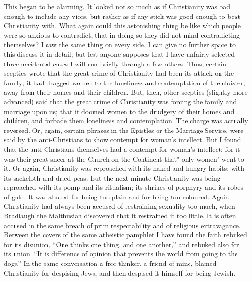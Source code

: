 \documentclass{book}
\begin{document}
This began to be alarming. It looked not so much as if Christianity was bad enough to include any vices, but rather as if any stick was good enough to beat Christianity with. What again could this astonishing thing be like which people were so anxious to contradict, that in doing so they did not mind contradicting themselves? I saw the same thing on every side. I can give no further space to this discuss it in detail; but lest anyone supposes that I have unfairly selected three accidental cases I will run briefly through a few others. Thus, certain sceptics wrote that the great crime of Christianity had been its attack on the family; it had dragged women to the loneliness and contemplation of the cloister, away from their homes and their children. But, then, other sceptics (slightly more advanced) said that the great crime of Christianity was forcing the family and marriage upon us; that it doomed women to the drudgery of their homes and children, and forbade them loneliness and contemplation. The charge was actually reversed. Or, again, certain phrases in the Epistles or the Marriage Service, were said by the anti-Christians to show contempt for woman’s intellect. But I found that the anti-Christians themselves had a contempt for woman’s intellect; for it was their great sneer at the Church on the Continent that" only women" went to it. Or again, Christianity was reproached with its naked and hungry habits; with its sackcloth and dried peas. But the next minute Christianity was being reproached with its pomp and its ritualism; its shrines of porphyry and its robes of gold. It was abused for being too plain and for being too coloured. Again Christianity had always been accused of restraining sexuality too much, when Bradlaugh the Malthusian discovered that it restrained it too little. It is often accused in the same breath of prim respectability and of religious extravagance. Between the covers of the same atheistic pamphlet I have found the faith rebuked for its disunion, “One thinks one thing, and one another,” and rebuked also for its union, “It is difference of opinion that prevents the world from going to the dogs.” In the same conversation a free-thinker, a friend of mine, blamed Christianity for despising Jews, and then despised it himself for being Jewish.
\end{document}
